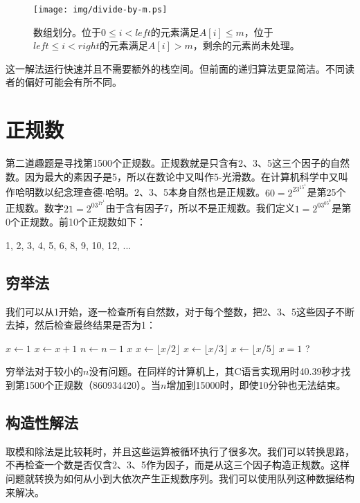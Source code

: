 \documentclass[b5paper]{ctexart}
\begin{document}
\begin{figure}[htbp]
  \centering
  \texttt{[image: img/divide-by-m.ps]}
  \caption{数组划分。位于$0 \leq i < left$的元素满足$A[i] \leq m$，位于$left \leq i < right$的元素满足$A[i] > m$，剩余的元素尚未处理。}
  \label{fig:divide}
\end{figure}

这一解法运行快速并且不需要额外的栈空间。但前面的递归算法更显简洁。不同读者的偏好可能会有所不同。

\section{正规数}

第二道趣题是寻找第1500个正规数。正规数就是只含有2、3、5这三个因子的自然数。因为最大的素因子是5，所以在数论中又叫作5-光滑数。在计算机科学中又叫作哈明数以纪念理查德$\cdot$哈明。2、3、5本身自然也是正规数。$60 = 2^23^15^1$是第25个正规数。数字$21 = 2^03^17^1$由于含有因子7，所以不是正规数。我们定义$1=2^03^05^0$是第0个正规数。前10个正规数如下：

1, 2, 3, 4, 5, 6, 8, 9, 10, 12, ...

\subsection{穷举法}
我们可以从1开始，逐一检查所有自然数，对于每个整数，把2、3、5这些因子不断去掉，然后检查最终结果是否为1：

\begin{algorithmic}[1]
  \State $x \gets 1$
    \State $x \gets x + 1$
      \State $n \gets n - 1$
    \EndIf
  \EndWhile
  \State \Return $x$
\EndFunction
\Statex
{}
    \State $x \gets \lfloor x / 2 \rfloor$
  \EndWhile
    \State $x \gets \lfloor x / 3 \rfloor$
  \EndWhile
    \State $x \gets \lfloor x / 5 \rfloor$
  \EndWhile
  \State \Return $x = 1$ ?
\EndFunction
\end{algorithmic}

穷举法对于较小的$n$没有问题。在同样的计算机上，其C语言实现用时40.39秒才找到第1500个正规数（860934420）。当$n$增加到15000时，即使10分钟也无法结束。

\subsection{构造性解法}
取模和除法是比较耗时\cite{Bentley}，并且这些运算被循环执行了很多次。我们可以转换思路，不再检查一个数是否仅含2、3、5作为因子，而是从这三个因子构造正规数。这样问题就转换为如何从小到大依次产生正规数序列。我们可以使用队列这种数据结构来解决。
\end{document}
